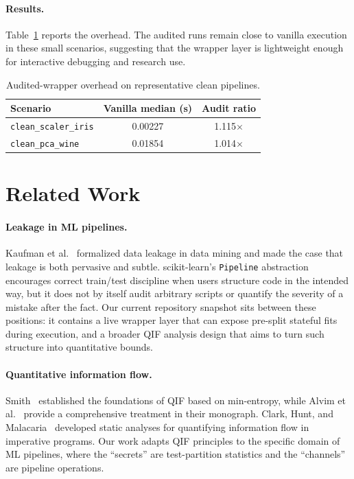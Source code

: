 \documentclass[11pt]{article}
\begin{document}
\paragraph{Results.}
Table~\ref{tab:live-overhead} reports the overhead.  The audited runs
remain close to vanilla execution in these small scenarios, suggesting
that the wrapper layer is lightweight enough for interactive debugging
and research use.

\begin{table}[t]
\centering
\caption{Audited-wrapper overhead on representative clean pipelines.}
\label{tab:live-overhead}
\begin{tabular}{@{}lcc@{}}
\toprule
\textbf{Scenario} & \textbf{Vanilla median (s)} & \textbf{Audit ratio} \\
\midrule
\texttt{clean\_scaler\_iris} & 0.00227 & 1.115$\times$ \\
\texttt{clean\_pca\_wine} & 0.01854 & 1.014$\times$ \\
\bottomrule
\end{tabular}
\end{table}

\section{Related Work}\label{sec:related}

\paragraph{Leakage in ML pipelines.}
Kaufman et al.~\cite{kaufman2012} formalized data leakage in data
mining and made the case that leakage is both pervasive and subtle.
scikit-learn's \texttt{Pipeline} abstraction~\cite{pedregosa2011}
encourages correct train/test discipline when users structure code in
the intended way, but it does not by itself audit arbitrary scripts or
quantify the severity of a mistake after the fact.  Our current
repository snapshot sits between these positions: it contains a live
wrapper layer that can expose pre-split stateful fits during execution,
and a broader QIF analysis design that aims to turn such structure into
quantitative bounds.

\paragraph{Quantitative information flow.}
Smith~\cite{smith2009} established the foundations of QIF based on
min-entropy, while Alvim et al.~\cite{alvim2020} provide a
comprehensive treatment in their monograph.  Clark, Hunt, and
Malacaria~\cite{clark2007} developed static analyses for quantifying
information flow in imperative programs.  Our work adapts QIF
principles to the specific domain of ML pipelines, where the
``secrets'' are test-partition statistics and the ``channels'' are
pipeline operations.
\end{document}
